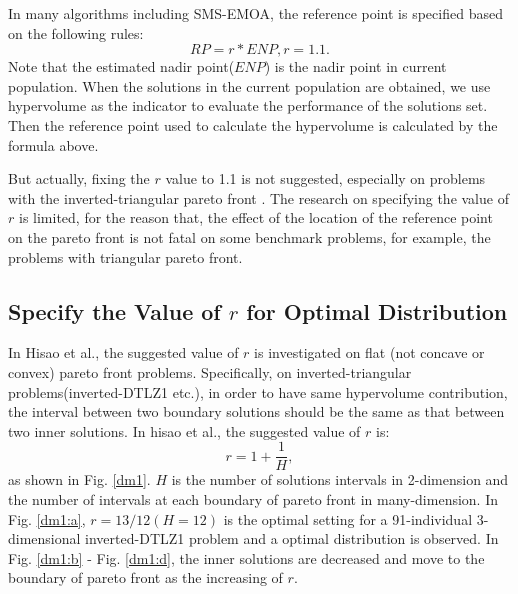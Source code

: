 \documentclass[conference]{IEEEtran}
\begin{document}
In many algorithms including SMS-EMOA\cite{smsemoa}, 
the reference point is specified based on the following rules:
\begin{equation}\label{frpa1}
  RP = r * ENP, r = 1.1.
\end{equation}
Note that the estimated nadir point($ENP$) is the nadir point in current population.
When the solutions in the current population are obtained, 
we use hypervolume as the indicator to evaluate the performance of the solutions set. 
Then the reference point used to calculate the hypervolume is calculated by the formula above.

But actually, fixing the $r$ value to 1.1 is not suggested, especially on problems with the inverted-triangular pareto front
\cite{hisao:RPhowtoSpecify}. 
The research on specifying the value of $r$ is limited, for the reason that, 
the effect of the location of the reference point on the pareto front 
is not fatal on some benchmark problems, for example, the problems with triangular pareto front. 

%
\subsection{Specify the Value of $r$ for Optimal Distribution}
In Hisao et al.\cite{hisao:RPexplanation, hisao:RPhowtoSpecify, hisao:RPspecify}, the suggested value of $r$ is investigated 
on flat (not concave or convex) pareto front problems. 
Specifically, on inverted-triangular problems(inverted-DTLZ1\cite{hisao:RPexplanation} etc.), 
in order to have same hypervolume contribution, 
the interval between two boundary solutions should be the same as that between two inner solutions.
In hisao et al.\cite{hisao:RPhowtoSpecify}, the suggested value of $r$ is:
\begin{equation}\label{eod}
  r=1+\frac{1}{H},
\end{equation}
as shown in Fig. \ref{dm1}. $H$ is the number of solutions intervals in 2-dimension 
and the number of intervals at each boundary of pareto front in many-dimension. 
In Fig. \ref{dm1:a}, $r=13/12(H=12)$ is the optimal setting for a 91-individual 3-dimensional 
inverted-DTLZ1 problem and a optimal distribution is observed. 
In Fig. \ref{dm1:b} - Fig. \ref{dm1:d}, the inner solutions are decreased and move to 
the boundary of pareto front as the increasing of $r$. 
\end{document}
